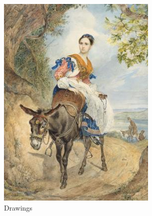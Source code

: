 \begin{figure}[htp]
    \centering
    \begin{subfigure}[t]{0.3\textwidth}
        \centering
        \includegraphics[width=\linewidth]{imagenes/dataset_examples/drawings.jpg}
        \caption*{Drawings}
    \end{subfigure}
    \begin{subfigure}[t]{0.3\textwidth}
        \centering

\end{subfigure}
\end{figure}
